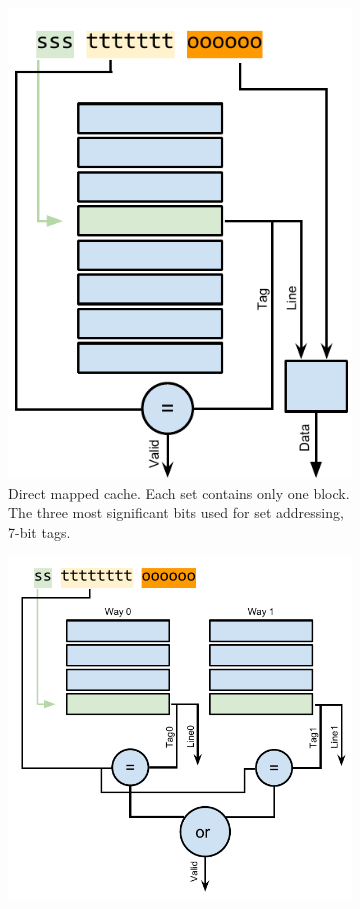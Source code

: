 \begin{figure}
    \centering
    \begin{subfigure}[b]{0.45\textwidth}
        \centering
        \includegraphics[width=.7\textwidth]{figures/introduction/dircache_read}
        \caption{Direct mapped cache. Each set contains only one block. The three most significant bits used for set addressing, 7-bit tags.}
        \label{fig:introduction:cache:dir}
    \end{subfigure}\hfill%
    \begin{subfigure}[b]{0.45\textwidth}
        \centering
        \includegraphics[width=.8\textwidth]{figures/introduction/2waycache_read}

\end{subfigure}
\end{figure}
